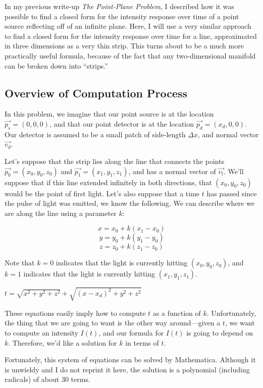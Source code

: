 \documentclass[11pt]{article}
\begin{document}
In my previous write-up \emph{The Point-Plane Problem}, I described how it was possible to find a closed form for the intensity response over time of a point source reflecting off of an infinite plane. Here, I will use a very similar approach to find a closed form for the intensity response over time for a line, approximated in three dimensions as a very thin strip. This turns about to be a much more practically useful formula, because of the fact that any two-dimensional manifold can be broken down into ``strips.''

\subsection{Overview of Computation Process}

In this problem, we imagine that our point source is at the location $\vec{p_s} = (0, 0, 0)$, and that our point detector is at the location $\vec{p_d} = (x_d, 0, 0)$. Our detector is assumed to be a small patch of side-length $\Delta x$, and normal vector $\vec{v_d}$. 

Let's suppose that the strip lies along the line that connects the points $\vec{p_0} = (x_0, y_0, z_0)$ and $\vec{p_1} = (x_1, y_1, z_1)$, and has a normal vector of $\vec{v_l}$. We'll suppose that if this line extended infinitely in both directions, that $(x_0, y_0, z_0)$ would be the point of first light. Let's also suppose that a time $t$ has passed since the pulse of light was emitted, we know the following. We can describe where we are along the line using a parameter $k$:

$$x = x_0 + k(x_1 - x_0)$$
$$y = y_0 + k(y_1 - y_0)$$
$$z = z_0 + k(z_1 - z_0)$$

Note that $k = 0$ indicates that the light is currently hitting $(x_0, y_0, z_0)$, and $k = 1$ indicates that the light is currently hitting $(x_1, y_1, z_1)$.

$t = \sqrt{x^2+y^2+z^2} + \sqrt{(x-x_d)^2 + y^2 + z^2}$

These equations easily imply how to compute $t$ as a function of $k$. Unfortunately, the thing that we are going to want is the other way around---given a $t$, we want to compute an intensity $I(t)$, and our formula for $I(t)$ is going to depend on $k$. Therefore, we'd like a solution for $k$ in terms of $t$.

Fortunately, this system of equations can be solved by Mathematica. Although it is unwieldy and I do not reprint it here, the solution is a polynomial (including radicals) of about 30 terms.
\end{document}
